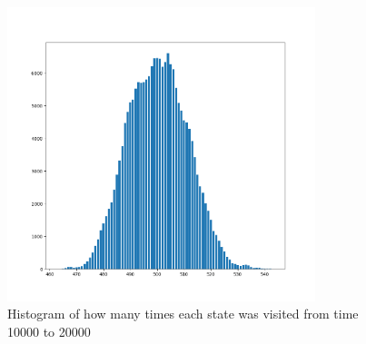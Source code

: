 \documentclass[letterpaper, reqno,11pt]{article}
\begin{document}
\begin{figure}[htpb]
    \centering
    \includegraphics[width=0.8\textwidth]{q6d}
    \caption{Histogram of how many times each state was visited from time 10000 to 20000}
    \label{fig:q6d}
\end{figure}
\end{document}

